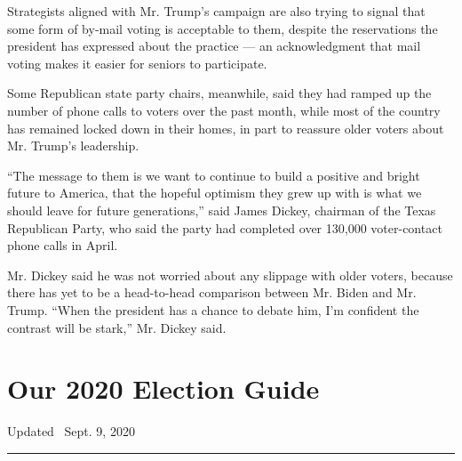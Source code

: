 Strategists aligned with Mr. Trump's campaign are also trying to signal
that some form of by-mail voting is acceptable to them, despite the
reservations the president has expressed about the practice --- an
acknowledgment that mail voting makes it easier for seniors to
participate.

Some Republican state party chairs, meanwhile, said they had ramped up
the number of phone calls to voters over the past month, while most of
the country has remained locked down in their homes, in part to reassure
older voters about Mr. Trump's leadership.

``The message to them is we want to continue to build a positive and
bright future to America, that the hopeful optimism they grew up with is
what we should leave for future generations,'' said James Dickey,
chairman of the Texas Republican Party, who said the party had completed
over 130,000 voter-contact phone calls in April.

Mr. Dickey said he was not worried about any slippage with older voters,
because there has yet to be a head-to-head comparison between Mr. Biden
and Mr. Trump. ``When the president has a chance to debate him, I'm
confident the contrast will be stark,'' Mr. Dickey said.

\hypertarget{our-2020-election-guide}{%
\section{Our 2020 Election Guide}\label{our-2020-election-guide}}

Updated ~Sept. 9, 2020

\begin{center}\rule{0.5\linewidth}{\linethickness}\end{center}

